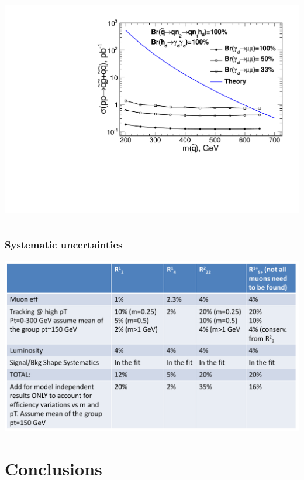\documentclass[compress]{beamer}
\begin{document}
\begin{frame}
\begin{columns}
\includegraphics[width=\linewidth]{ulimit_model1.pdf}
\end{columns}
\end{frame}

\begin{frame}
\frametitle{Systematic uncertainties}
\mbox{\hspace{-0.5 cm}\includegraphics[width=1.1\linewidth]{alexei5.png}}
\end{frame}

\section*{Conclusions}
\end{document}
